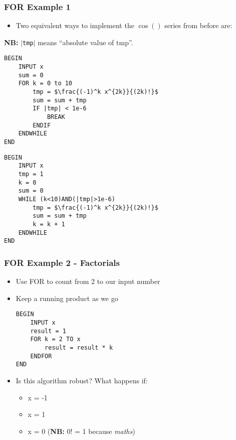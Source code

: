 \documentclass[14pt]{beamer}
\begin{document}
\begin{frame}[fragile]
\frametitle{FOR Example 1}
\begin{itemize}
\item Two equivalent ways to implement the $\cos()$ series from before are:
\end{itemize}
{\small\textbf{NB:} $|$\texttt{tmp}$|$ means ``absolute value of tmp''.}
\begin{multicols}{2}
\begin{lstlisting}[style=pseudo,mathescape=true,basicstyle=\ttfamily\scriptsize]
BEGIN
	INPUT x
	sum = 0
	FOR k = 0 to 10
		tmp = $\frac{(-1)^k x^{2k}}{(2k)!}$
		sum = sum + tmp
		IF |tmp| < 1e-6
			BREAK
		ENDIF
	ENDWHILE 
END
\end{lstlisting}
\columnbreak
\begin{lstlisting}[style=pseudo,mathescape=true,basicstyle=\ttfamily\scriptsize]
BEGIN
	INPUT x
	tmp = 1
	k = 0
	sum = 0
	WHILE (k<10)AND(|tmp|>1e-6)
		tmp = $\frac{(-1)^k x^{2k}}{(2k)!}$
		sum = sum + tmp
		k = k + 1
	ENDWHILE 
END
\end{lstlisting}

\end{multicols}
\end{frame}

\begin{frame}[fragile]
\frametitle{FOR Example 2 - Factorials}
\begin{itemize}
\item Use FOR to count from 2 to our input number
\item Keep a running product as we go
\begin{lstlisting}[style=pseudo]
BEGIN
	INPUT x
	result = 1
	FOR k = 2 TO x
		result = result * k
	ENDFOR
END
\end{lstlisting}
\item Is this algorithm robust? What happens if:
	\begin{itemize}
		\item x = -1
		\item x = 1
		\item x = 0 (\textbf{NB:} 0! = 1 because \textit{maths})
	\end{itemize}
\end{itemize}
\end{frame}
\end{document}
